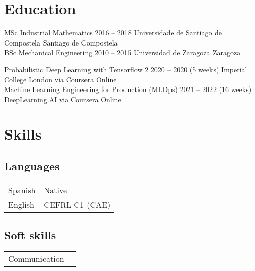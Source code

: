 \documentclass[a4]{article}
\begin{document}
\vspace{12pt}

\section*{Education}

\cvitem
    {MSc Industrial Mathematics}
    {2016 -- 2018 }
    {Universidade de Santiago de Compostela}
    {Santiago de Compostela}
\vspace{10pt}\\\cvitem
    {BSc Mechanical Engineering}
    {2010 -- 2015 }
    {Universidad de Zaragoza}
    {Zaragoza}
\vspace{10pt}\\


\cvitem
    {Probabilistic Deep Learning with Tensorflow 2}
    {2020 -- 2020 (5 weeks)}
    {Imperial College London via Coursera}
    {Online}
\vspace{10pt}\\\cvitem
    {Machine Learning Engineering for Production (MLOps)}
    {2021 -- 2022 (16 weeks)}
    {DeepLearning.AI via Coursera}
    {Online}
\vspace{10pt}\\

\section*{Skills}

\subsection*{Languages}

\begin{tabular}[t]{ll}
    Spanish & Native\\
    English & CEFRL C1 (CAE)\\
  \end{tabular}

\subsection*{Soft skills}

\begin{tabular}[t]{ll}
    Communication\\
  \end{tabular}
\end{document}
